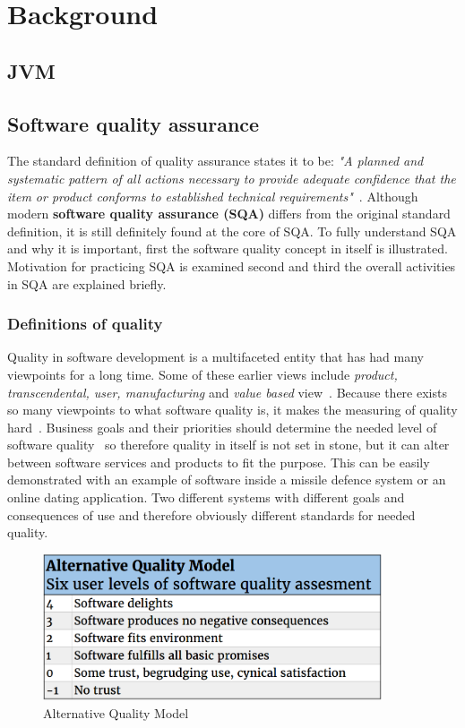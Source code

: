 \chapter{Background}
\label{chapter:background} 

\section{JVM} %
\section{Software quality assurance} %
    The standard definition of quality assurance states it to be:
        \textit{"A planned and systematic pattern
        of all actions necessary to provide adequate confidence
        that the item or product conforms to established
        technical requirements"}~\cite{buckley1978standard}.
    Although modern \textbf{software quality assurance (SQA)} differs from the original standard definition, it is still definitely found
    at the core of SQA. To fully understand SQA and why it is important, first the software quality concept in itself is illustrated.
    Motivation for practicing SQA is examined second and third the overall activities in SQA are explained briefly.
    \subsection{Definitions of quality}
    Quality in software development is a multifaceted entity that has had many viewpoints for a long time.
    Some of these earlier views include \textit{product, transcendental, user, manufacturing} and \textit{value based} view~\cite{kitchenham1996elusive}.
    Because there exists so many viewpoints to what software quality is, it makes the measuring of quality hard~\cite{kitchenham1996elusive}.
    Business goals and their priorities should determine the needed level of software quality~\cite{kitchenham1996elusive} so therefore
    quality in itself is not set in stone, but it can alter between software services and products to fit the purpose.
    This can be easily demonstrated with an example of software inside a missile defence system or an online dating application.
    Two different systems with different goals and consequences of use and therefore obviously different standards for needed quality.

    \begin{figure}[ht]
      \begin{center}
        \includegraphics[width=10cm]{images/alternativeQM.png}
        \caption{Alternative Quality Model}
        \label{fig:AQM}
      \end{center}
    \end{figure}


